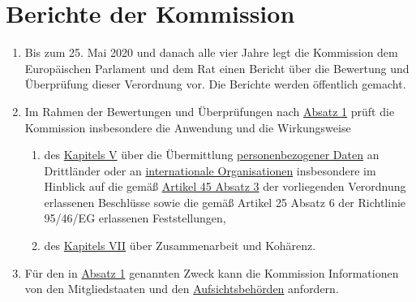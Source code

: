 \chapter{Berichte der Kommission}
\label{ch:97}


\begin{enumerate}

  \item Bis zum 25. Mai 2020 und danach alle vier Jahre legt die Kommission dem Europäischen Parlament und dem Rat einen
   Bericht über die Bewertung und Überprüfung dieser Verordnung vor. Die Berichte werden öffentlich gemacht.
  \label{itm:97-1}

  \item Im Rahmen der Bewertungen und Überprüfungen nach \hyperref[itm:97-1]{Absatz 1} prüft die Kommission insbesondere
   die Anwendung und die Wirkungsweise%
  \label{itm:97-2}

  \begin{enumerate}
  
    \item des \hyperref[part:5]{Kapitels V} über die Übermittlung \hyperref[itm:04-1]{personenbezogener Daten} an
     Drittländer oder an \hyperref[itm:04-26]{internationale Organisationen} insbesondere im Hinblick auf die
     gemäß \hyperref[itm:45-3]{Artikel 45 Absatz 3} der vorliegenden Verordnung erlassenen Beschlüsse sowie die gemäß
     Artikel 25 Absatz 6 der Richtlinie 95/46/EG erlassenen Feststellungen,%
    \label{itm:97-2a}

    \item des \hyperref[part:7]{Kapitels VII} über Zusammenarbeit und Kohärenz.%
    \label{itm:97-2b}

  \end{enumerate}

  \item Für den in \hyperref[itm:97-1]{Absatz 1} genannten Zweck kann die Kommission Informationen von den
   Mitgliedstaaten und den \hyperref[itm:04-21]{Aufsichtsbehörden} anfordern.%
  \label{itm:97-3}


\end{enumerate}
